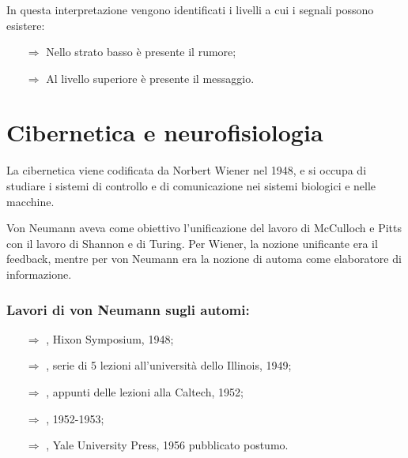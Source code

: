 \subsubsection{}
In questa interpretazione vengono identificati i livelli a cui i segnali possono esistere:
\begin{itemize}
    \item [$\Rightarrow$] Nello strato basso è presente il rumore;
    \item [$\Rightarrow$] Al livello superiore è presente il messaggio.
\end{itemize}

\section{Cibernetica e neurofisiologia}

La cibernetica viene codificata da Norbert Wiener nel 1948, e si occupa di studiare i sistemi di controllo e di comunicazione nei sistemi biologici 
e nelle macchine.

Von Neumann aveva come obiettivo l'unificazione del lavoro di McCulloch e Pitts con il lavoro di Shannon e di Turing. Per Wiener,
la nozione unificante era il feedback, mentre per von Neumann era la nozione di automa come
elaboratore di informazione.

\subsubsection{Lavori di von Neumann sugli automi:}

\begin{itemize}
    \item [$\Rightarrow$] , Hixon Symposium, 1948;
    \item [$\Rightarrow$] , serie di 5 lezioni all'università dello Illinois, 1949;
    \item [$\Rightarrow$] , appunti delle lezioni alla Caltech, 1952;
    \item [$\Rightarrow$] , 1952-1953;
    \item [$\Rightarrow$] , Yale University Press, 1956 pubblicato postumo.
\end{itemize}


